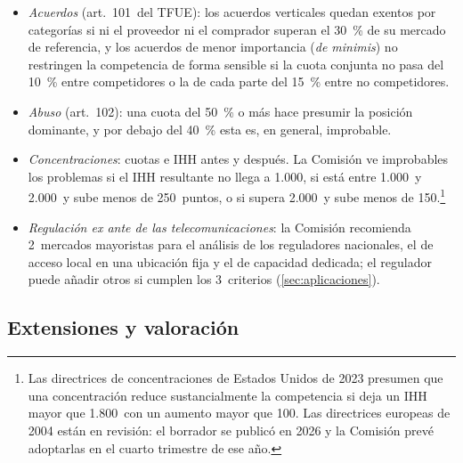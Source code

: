 \documentclass[11pt]{article}
\begin{document}
\begin{itemize}
\item \emph{Acuerdos} (art.~101~del TFUE): los acuerdos verticales quedan exentos por categorías si ni el proveedor ni el comprador superan el 30~\% de su mercado de referencia\nocite{UE2022RECAV}, y los acuerdos de menor importancia (\emph{de minimis}) no restringen la competencia de forma sensible si la cuota conjunta no pasa del 10~\% entre competidores o la de cada parte del 15~\% entre no competidores\nocite{CE2014DeMinimis}.
\item \emph{Abuso} (art.~102): una cuota del 50~\% o más hace presumir la posición dominante\nocite{TJUE1991AKZO}, y por debajo del 40~\% esta es, en general, improbable\nocite{CE2026DirectricesExclusion}.
\item \emph{Concentraciones}: cuotas e IHH antes y después\nocite{UE2004Reglamento139,CE2004Horizontales}. La Comisión ve improbables los problemas si el IHH resultante no llega a 1.000, si está entre 1.000~y 2.000~y sube menos de 250~puntos, o si supera 2.000~y sube menos de 150\nocite{CE2004Horizontales}.\footnote{Las directrices de concentraciones de Estados Unidos de 2023 presumen que una concentración reduce sustancialmente la competencia si deja un IHH mayor que 1.800~con un aumento mayor que 100\nocite{DOJFTC2023Merger}. Las directrices europeas de 2004 están en revisión: el borrador se publicó en 2026 y la Comisión prevé adoptarlas en el cuarto trimestre de ese año\nocite{CE2026RevisionMerger}.}
\item \emph{Regulación ex ante de las telecomunicaciones}: la Comisión recomienda 2~mercados mayoristas para el análisis de los reguladores nacionales, el de acceso local en una ubicación fija y el de capacidad dedicada\nocite{UE2020RecomendacionMercados}; el regulador puede añadir otros si cumplen los 3~criterios (\ref{sec:aplicaciones}).
\end{itemize}

\subsection{Extensiones y valoración}\label{anexo:mercado-extensiones}
\end{document}
